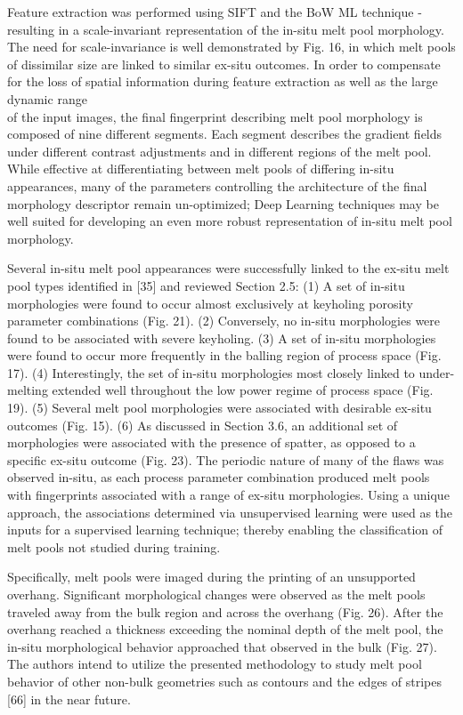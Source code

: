 \documentclass[10pt]{article}
\begin{document}
Feature extraction was performed using SIFT and the BoW ML technique - resulting in a scale-invariant representation of the in-situ melt pool morphology. The need for scale-invariance is well demonstrated by Fig. 16, in which melt pools of dissimilar size are linked to similar ex-situ outcomes. In order to compensate for the loss of spatial information during feature extraction as well as the large dynamic range\\
of the input images, the final fingerprint describing melt pool morphology is composed of nine different segments. Each segment describes the gradient fields under different contrast adjustments and in different regions of the melt pool. While effective at differentiating between melt pools of differing in-situ appearances, many of the parameters controlling the architecture of the final morphology descriptor remain un-optimized; Deep Learning techniques may be well suited for developing an even more robust representation of in-situ melt pool morphology.

Several in-situ melt pool appearances were successfully linked to the ex-situ melt pool types identified in [35] and reviewed Section 2.5: (1) A set of in-situ morphologies were found to occur almost exclusively at keyholing porosity parameter combinations (Fig. 21). (2) Conversely, no in-situ morphologies were found to be associated with severe keyholing. (3) A set of in-situ morphologies were found to occur more frequently in the balling region of process space (Fig. 17). (4) Interestingly, the set of in-situ morphologies most closely linked to under-melting extended well throughout the low power regime of process space (Fig. 19). (5) Several melt pool morphologies were associated with desirable ex-situ outcomes (Fig. 15). (6) As discussed in Section 3.6, an additional set of morphologies were associated with the presence of spatter, as opposed to a specific ex-situ outcome (Fig. 23). The periodic nature of many of the flaws was observed in-situ, as each process parameter combination produced melt pools with fingerprints associated with a range of ex-situ morphologies. Using a unique approach, the associations determined via unsupervised learning were used as the inputs for a supervised learning technique; thereby enabling the classification of melt pools not studied during training.

Specifically, melt pools were imaged during the printing of an unsupported overhang. Significant morphological changes were observed as the melt pools traveled away from the bulk region and across the overhang (Fig. 26). After the overhang reached a thickness exceeding the nominal depth of the melt pool, the in-situ morphological behavior approached that observed in the bulk (Fig. 27). The authors intend to utilize the presented methodology to study melt pool behavior of other non-bulk geometries such as contours and the edges of stripes [66] in the near future.
\end{document}
